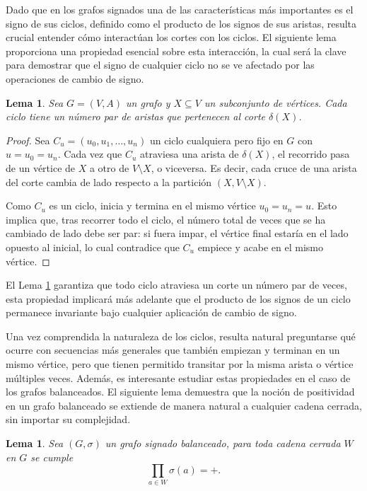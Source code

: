 \documentclass[11pt,a4paper,spanish]{report}
\theoremstyle{plain}
\newtheorem{lema}[teorema]{Lema}
\begin{document}
Dado que en los grafos signados una de las características más importantes es el signo de sus ciclos, definido como el producto de los signos de sus aristas, resulta crucial entender cómo interactúan los cortes con los ciclos. El siguiente lema proporciona una propiedad esencial sobre esta interacción, la cual será la clave para demostrar que el signo de cualquier ciclo no se ve afectado por las operaciones de cambio de signo.






\begin{lema}\label{ciclo par}
Sea $G=(V,A)$ un grafo y $X \subseteq V$ un subconjunto de vértices. Cada ciclo tiene un número par de aristas que pertenecen al corte $\delta(X)$.
\end{lema}
\begin{proof}
    Sea $C_u = (u_0, u_1, \dots, u_n )$ un ciclo cualquiera pero fijo en $G$ con $u=u_0=u_n$. 
Cada vez que $C_u$ atraviesa una arista de $\delta(X)$, el recorrido pasa de un vértice de $X$ 
a otro de $V \setminus X$, o viceversa. Es decir, cada cruce de una arista del corte 
cambia de lado respecto a la partición $(X, V \setminus X)$.

Como $C_u$ es un ciclo,  inicia y termina en el mismo vértice $u_0=u_n=u$. 
Esto implica que, tras recorrer todo el ciclo, el número total de veces 
que se ha cambiado de lado debe ser par: 
si fuera impar, el vértice final estaría en el lado opuesto al inicial, 
lo cual contradice que $C_u$ empiece y acabe en el mismo vértice.
\end{proof}
El Lema \ref{ciclo par} garantiza que todo ciclo atraviesa un corte un número par de veces, esta propiedad implicará más adelante que el producto de los signos de un ciclo permanece invariante bajo cualquier aplicación de cambio de signo.



Una vez comprendida la naturaleza de los ciclos, resulta natural preguntarse qué ocurre con secuencias más generales que también empiezan y terminan en un mismo vértice, pero que tienen permitido transitar por la misma arista o vértice múltiples veces. Además, es interesante  estudiar estas propiedades en el caso de los grafos balanceados. El siguiente lema demuestra que la noción de positividad en un grafo balanceado se extiende de manera natural a cualquier cadena cerrada, sin importar su complejidad.


\begin{lema}\label{lema:recorridocerrado}
Sea $(G,\sigma)$ un grafo signado balanceado, para toda cadena cerrada $W$ en $G$ se cumple
\[
\prod_{a\in W}\sigma(a) = +.
\]
\end{lema}
\end{document}
